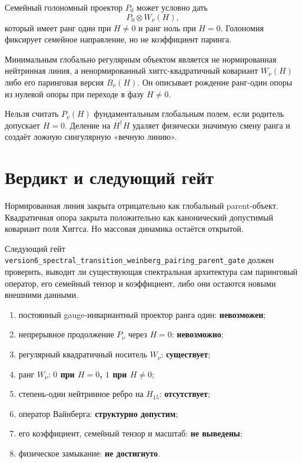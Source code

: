 Семейный голономный проектор $P_0$ может условно дать
\begin{equation}
 P_0\otimes W_\nu(H),
\end{equation}
который имеет ранг один при $H\ne0$ и ранг ноль при $H=0$. Голономия
фиксирует семейное направление, но не коэффициент паринга.

\begin{proposition}
Минимальным глобально регулярным объектом является не нормированная
нейтринная линия, а ненормированный хиггс-квадратичный ковариант
$W_\nu(H)$ либо его паринговая версия $B_\nu(H)$. Он описывает рождение
ранг-один опоры из нулевой опоры при переходе в фазу $H\ne0$.
\end{proposition}

\begin{nogocriterion}
Нельзя считать $P_\nu(H)$ фундаментальным глобальным полем, если
родитель допускает $H=0$. Деление на $H^\dagger H$ удаляет физически
значимую смену ранга и создаёт ложную сингулярную «вечную линию».
\end{nogocriterion}

\section{Вердикт и следующий гейт}

Нормированная линия закрыта отрицательно как глобальный parent-объект.
Квадратичная опора закрыта положительно как канонический допустимый
ковариант поля Хиггса. Но массовая динамика остаётся открытой.

Следующий гейт
\texttt{version6\_spectral\_transition\_weinberg\_pairing\_parent\_gate}
должен проверить, выводит ли существующая спектральная архитектура сам
паринговый оператор, его семейный тензор и коэффициент, либо они остаются
новыми внешними данными.

\begin{protocol}
\begin{enumerate}
 \item постоянный gauge-инвариантный проектор ранга один:
 \textbf{невозможен};
 \item непрерывное продолжение $P_\nu$ через $H=0$:
 \textbf{невозможно};
 \item регулярный квадратичный носитель $W_\nu$:
 \textbf{существует};
 \item ранг $W_\nu$: \textbf{$0$ при $H=0$, $1$ при $H\ne0$};
 \item степень-один нейтринное ребро на $H_{15}$:
 \textbf{отсутствует};
 \item оператор Вайнберга: \textbf{структурно допустим};
 \item его коэффициент, семейный тензор и масштаб:
 \textbf{не выведены};
 \item физическое замыкание: \textbf{не достигнуто}.
\end{enumerate}
\end{protocol}

